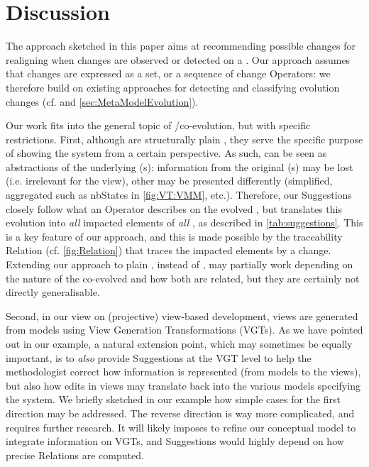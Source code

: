 \section{Discussion}
\label{sec:Discussion}

The approach sketched in this paper aims at recommending possible changes 
for realigning \viewtypes when changes are observed or detected on a 
\metamodel. Our approach assumes that \metamodel changes are expressed
as a set, or a sequence of change \textsf{Operator}s: we therefore build
on existing approaches for detecting and classifying evolution changes
(cf. \cite{herrmannsdoerfer_extensive_2011,khelladi_detecting_2015} and  \cref{sec:MetaModelEvolution}).

Our work fits into the general topic of \metamodel/\metamodel co-evolution,
but with specific restrictions. First, although \viewtypes are structurally 
plain \metamodels, they serve the specific purpose of showing the system from a certain perspective.
As such, \viewtypes can
be seen as abstractions of the underlying \metamodel{}(s): information from
the original \metamodel{}(s) may be lost (i.e. irrelevant for the view), other
may be presented differently (simplified, aggregated such as \textsf{nbStates} in
\cref{fig:VT:VMM}, etc.). Therefore, our
\textsf{Suggestion}s closely follow what an \textsf{Operator} describes on
the evolved \metamodel, but translates this evolution into \emph{all} impacted
elements of \emph{all} \viewtypes, as described in \cref{tab:suggestions}.
This is a key feature of our approach, and this is made possible by the traceability \textsf{Relation} 
(cf. \cref{fig:Relation}) that traces the impacted \viewtype elements by a change.
Extending our approach to plain \metamodels, instead of \viewtypes, may partially
work depending on the nature of the co-evolved \metamodels and how
both \metamodels are related, but they are certainly not directly generalisable.

Second, in our view on (projective) view-based development, views are generated
from models using View Generation Transformations (VGTs). As we have pointed out in our
example, a natural extension point, which may sometimes be equally important,
is to \emph{also} provide \textsf{Suggestion}s at the VGT level to help the
methodologist correct how information is represented (from models to the views),
but also how edits in views may translate back into the various models specifying
the system. We briefly sketched in our example how simple cases for the first 
direction may be addressed. The reverse direction is way more complicated, and 
requires further research. 
It will likely imposes to refine our conceptual model to integrate information
on VGTs, and \textsf{Suggestion}s would highly depend on how precise 
\textsf{Relation}s are computed. 


